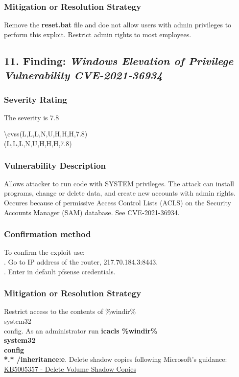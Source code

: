 \documentclass[notitlepage]{article}
\begin{document}
	\subsubsection{Mitigation or Resolution Strategy}
	\indent Remove the \textbf{reset.bat} file and doe not allow users with admin privileges to perform this exploit. Restrict admin rights to most employees.

	\subsection{11. Finding: \emph{Windows Elevation of Privilege Vulnerability CVE-2021-36934}}
	
	\subsubsection{Severity Rating}
	\indent The severity is 7.8 
	
	\textbackslash cvss(L,L,L,N,U,H,H,H,7.8)\\
	\cvss(L,L,L,N,U,H,H,H,7.8) \\
	
	\subsubsection{Vulnerability Description}
	\indent Allows attacker to run code with SYSTEM privileges.  The attack can install programs, change or delete data, and create new accounts with admin rights. Occures because of permissive Access Control Lists (ACLS) on the Security Accounts Manager (SAM) database. See CVE-2021-36934.\\
	
	\subsubsection{Confirmation method}
	To confirm the exploit use: \\
	. Go to IP address of the router, 217.70.184.3:8443.\\
	. Enter in default pfsense credentials.\\
	
	\subsubsection{Mitigation or Resolution Strategy}
	\indent Restrict access to the contents of \%windir\%\\system32\\config. As an administrator run \textbf{icacls \%windir\%\\system32\\config\\*.* /inheritance:e}.
	Delete shadow copies following Microsoft's guidance:   	\href{https://support.microsoft.com/en-us/topic/kb5005357-delete-volume-shadow-copies-1ceaa637-aaa3-4b58-a48b-baf72a2fa9e72}{KB5005357 - Delete Volume Shadow Copies} \\
	
\end{document}
